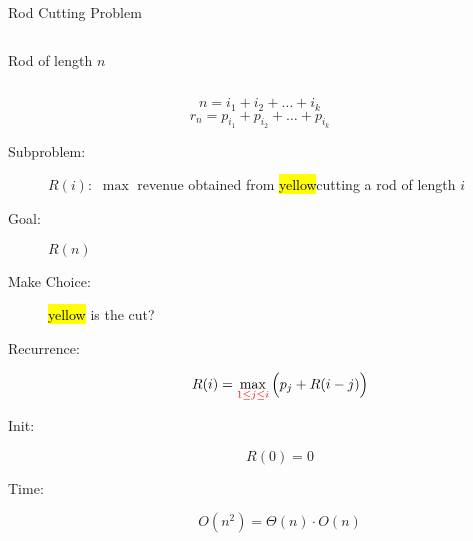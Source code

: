 
\begin{frame}{}
  \centerline{\LARGE {}}

  \vspace{0.50cm}
\end{frame}

\begin{frame}{}
  \begin{exampleblock}{Rod Cutting Problem}
    \begin{columns}
	\begin{center}
	  {\large Rod of length $n$}

	\end{center}
      \pause
	\begin{table}[]
	  \centering
	\end{table}
    \end{columns}

    \pause
    \vspace{0.60cm}
    \[
      n = i_1 + i_2 + \dots + i_k
    \]
    \[
      r_n = p_{i_1} + p_{i_2} + \dots + p_{i_k}
    \]
  \end{exampleblock}
\end{frame}

\begin{frame}{}
  \begin{description}
    \item[Subproblem:] $R(i):$ $\max$ revenue obtained from \hl{yellow}{cutting a rod of length $i$}
    \item[Goal:] $R(n)$
      \pause
      \vspace{0.30cm}
    \item[Make Choice:] \hl{yellow}{ is the {\it {}} cut?}
    \item[Recurrence:] 
      \[
	R(i) = \max_{\textcolor{red}{1 \le j \le i}} \Big(p_j + R(i-j)\Big)
      \]
      \pause
    \item[Init:]
      \[
	R(0) = 0
      \]
      \pause
    \item[Time:] 
      \[
	O(n^2) = \Theta(n) \cdot O(n)
      \]
  \end{description}
\end{frame}

